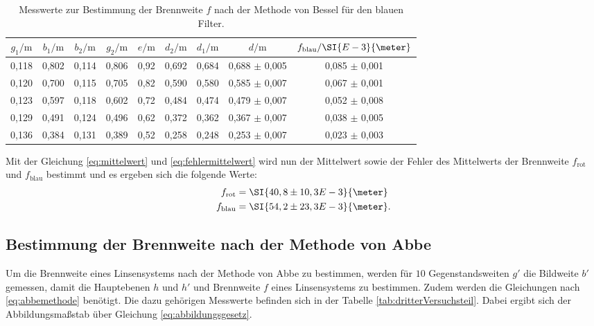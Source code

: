 \begin{table}[htpb]
	\centering
	\caption{Messwerte zur Bestimmung der Brennweite $f$ nach der Methode von Bessel für den blauen Filter.}
	\label{tab:zweiterbVersuchsteil}
	\begin{tabular}{c c c c c c c c c}
		\toprule
		$g_1 / \si{\meter}$ & $b_1 / \si{\meter}$ & $b_2 /\si{\meter}$ & $g_2/ \si{\meter}$ & $e / \si{\meter}$ & $d_2 / \si{\meter}$ & $d_1 / \si{\meter}$ & $d / \si{\meter}$& $f_\text{blau} / \SI{E-3}{\meter}$  \\
		\midrule
         0,118 & 0,802 & 0,114 & 0,806 & 0,92 & 0,692 & 0,684 & 0,688 $\pm$ 0,005 & 0,085 $\pm$ 0,001 \\
         0,120 & 0,700 & 0,115 & 0,705 & 0,82 & 0,590 & 0,580 & 0,585 $\pm$ 0,007 & 0,067 $\pm$ 0,001 \\
         0,123 & 0,597 & 0,118 & 0,602 & 0,72 & 0,484 & 0,474 & 0,479 $\pm$ 0,007 & 0,052 $\pm$ 0,008 \\
         0,129 & 0,491 & 0,124 & 0,496 & 0,62 & 0,372 & 0,362 & 0,367 $\pm$ 0,007 & 0,038 $\pm$ 0,005 \\
         0,136 & 0,384 & 0,131 & 0,389 & 0,52 & 0,258 & 0,248 & 0,253 $\pm$ 0,007 & 0,023 $\pm$ 0,003 \\
		\bottomrule
	\end{tabular}
\end{table}

Mit der Gleichung \ref{eq:mittelwert} und \ref{eq:fehlermittelwert} wird nun der Mittelwert sowie der Fehler des Mittelwerts der Brennweite $f_\text{rot}$ und $f_\text{blau}$ bestimmt und es ergeben sich die folgende Werte:
\begin{align*}
f_\text{rot} &= \SI{40,8 \pm 10,3 E-3}{\meter} \\
f_\text{blau} &= \SI{54,2 \pm 23,3 E-3}{\meter}.
\end{align*}

\subsection{Bestimmung der Brennweite nach der Methode von Abbe}
Um die Brennweite eines Linsensystems nach der Methode von Abbe zu bestimmen, werden für $10$ Gegenstandsweiten $g'$ die Bildweite $b'$ gemessen, damit die Hauptebenen $h$ und $h'$ und Brennweite $f$ eines Linsensystems zu bestimmen. Zudem werden die Gleichungen nach \ref{eq:abbemethode} benötigt. Die dazu gehörigen Messwerte befinden sich in der Tabelle \ref{tab:dritterVersuchsteil}. Dabei ergibt sich der Abbildungsmaßstab über Gleichung \ref{eq:abbildungsgesetz}.

